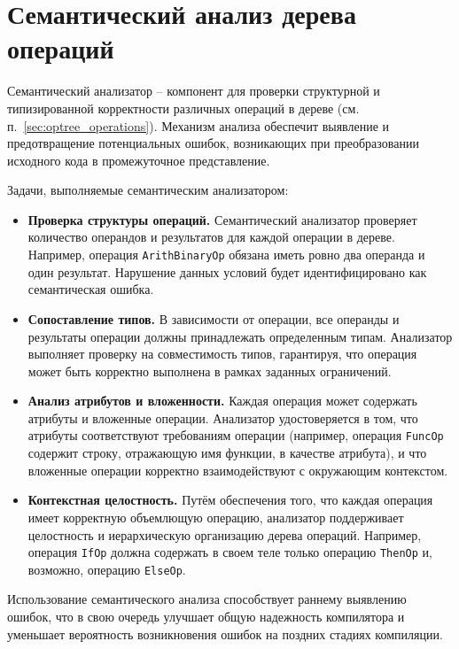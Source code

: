 \newpage
\section{Семантический анализ дерева операций}
\label{sec:semantizer}

Семантический анализатор -- компонент для проверки структурной и типизированной корректности различных операций в дереве (см. п.~\ref{sec:optree_operations}).
Механизм анализа обеспечит выявление и предотвращение потенциальных ошибок, возникающих при преобразовании исходного кода в промежуточное представление.

Задачи, выполняемые семантическим анализатором:

\begin{itemize}
    \item \textbf{Проверка структуры операций.}
          Семантический анализатор проверяет количество операндов и результатов для каждой операции в дереве.
          Например, операция \verb|ArithBinaryOp| обязана иметь ровно два операнда и один результат.
          Нарушение данных условий будет идентифицировано как семантическая ошибка.
    \item \textbf{Сопоставление типов.}
          В зависимости от операции, все операнды и результаты операции должны принадлежать определенным типам.
          Анализатор выполняет проверку на совместимость типов, гарантируя, что операция может быть корректно выполнена в рамках заданных ограничений.
    \item \textbf{Анализ атрибутов и вложенности.}
          Каждая операция может содержать атрибуты и вложенные операции.
          Анализатор удостоверяется в том, что атрибуты соответствуют требованиям операции (например, операция \verb|FuncOp| содержит строку, отражающую имя функции, в качестве атрибута), и что вложенные операции корректно взаимодействуют с окружающим контекстом.
    \item \textbf{Контекстная целостность.}
          Путём обеспечения того, что каждая операция имеет корректную объемлющую операцию, анализатор поддерживает целостность и иерархическую организацию дерева операций.
          Например, операция \verb|IfOp| должна содержать в своем теле только операцию \verb|ThenOp| и, возможно, операцию \verb|ElseOp|.
\end{itemize}

Использование семантического анализа способствует раннему выявлению ошибок, что в свою очередь улучшает общую надежность компилятора и уменьшает вероятность возникновения ошибок на поздних стадиях компиляции.

